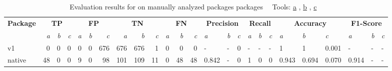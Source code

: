 \begin{table}[htp!]
    \centering
    \caption[Evaluation results for \toolSafer{} on manually analyzed packages packages]
        {Evaluation results for \toolSafer{} on manually analyzed packages packages~\newline \tiny ~\newline \footnotesize
        Tools: \underline{a} \toolSafer{}, \underline{b} \toolVet{}, \underline{c} \toolGosec{} \tiny ~\newline}
    \label{tbl:go-safer-evaluation-packages}
    \begin{adjustbox}{max width=\textwidth}
        \begin{tabular}{l||rrr|rrr|rrr|rrr||lll|lll|lll|lll}
            \textbf{Package} & \multicolumn{3}{c|}{\textbf{TP}}                & \multicolumn{3}{c|}{\textbf{FP}}                   & \multicolumn{3}{c|}{\textbf{TN}}                    & \multicolumn{3}{c||}{\textbf{FN}}                  & \multicolumn{3}{c|}{\textbf{Precision}}  & \multicolumn{3}{c|}{\textbf{Recall}}    & \multicolumn{3}{c|}{\textbf{Accuracy}}           & \multicolumn{3}{c}{\textbf{F1-Score}}    \\
            {}               & \textit{a}            & \textit{b} & \textit{c} & \textit{a}             & \textit{b} & \textit{c}   & \textit{a}            & \textit{b}   & \textit{c}   & \textit{a}             & \textit{b}  & \textit{c}  & \textit{a}     & \textit{b} & \textit{c} & \textit{a}    & \textit{b} & \textit{c} & \textit{a}     & \textit{b}     & \textit{c}     & \textit{a}     & \textit{b} & \textit{c} \\
            \hline
            v1               & 0                     & 0          & 0          & 0                      & 0          & 676          & 676                   & 676          & 1            & 0                      & 0           & 0           & -              & -          & 0          & -             & -          & -          & 1              & 1              & 0.001          & -              & -          & -          \\
            native           & 48                    & 0          & 0          & 9                      & 0          & 98           & 101                   & 109          & 11           & 0                      & 48          & 48          & 0.842          & -          & 0          & 1             & 0          & 0          & 0.943          & 0.694          & 0.070          & 0.914          & -          & -          \\

\end{tabular}
\end{adjustbox}
\end{table}
